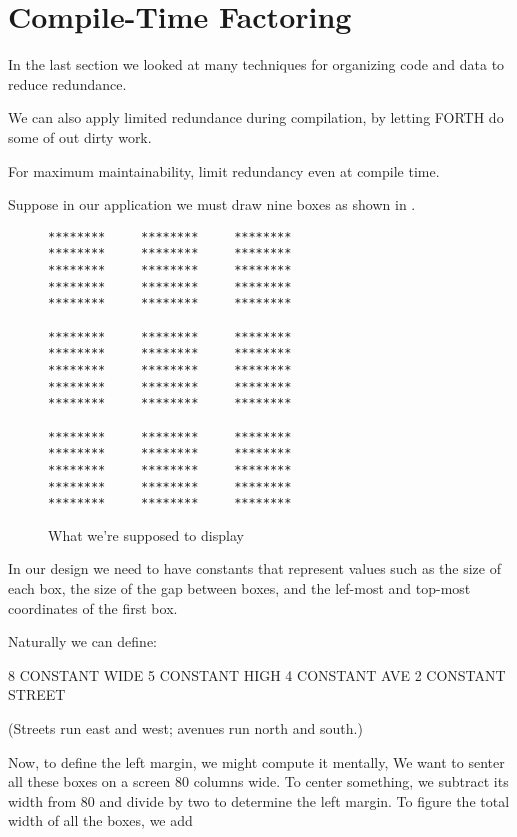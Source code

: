 \section{{Compile-Time Factoring}}

\noindent
In the last section we looked at many techniques for organizing code and data to reduce redundance.

We can also apply limited redundance during compilation, by letting FORTH do some of out dirty work.

\begin{tip}
For maximum maintainability, limit redundancy even at compile time.
\end{tip}
Suppose in our application we must draw nine boxes as shown in .

\begin{figure*}[tttt]
\caption{What we're supposed to display}
\begin{center}
\begin{BVerbatim}
********     ********     ********
********     ********     ********
********     ********     ********
********     ********     ********
********     ********     ********

********     ********     ********
********     ********     ********
********     ********     ********
********     ********     ********
********     ********     ********

********     ********     ********
********     ********     ********
********     ********     ********
********     ********     ********
********     ********     ********
\end{BVerbatim}
\end{center}
\end{figure*}

In our design we need to have constants that represent values such as the size of each box, the size of the gap between boxes, and the lef-most and top-most coordinates of the first box.

Naturally we can define:

\begin{Code}
8 CONSTANT WIDE
5 CONSTANT HIGH
4 CONSTANT AVE
2 CONSTANT STREET
\end{Code}
(Streets run east and west; avenues run north and south.)

Now, to define the left margin, we might compute it mentally, We want to senter all these boxes on a screen 80 columns wide. To center something, we subtract its width from 80 and divide by two to determine the left margin. To figure the total width of all the boxes, we add

